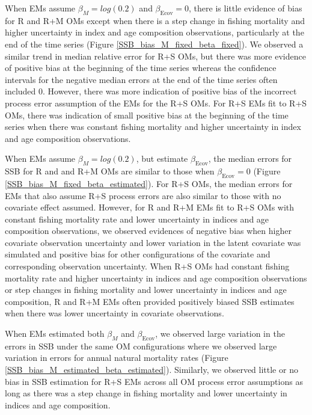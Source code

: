 \documentclass[
  12pt,
]{article}
\begin{document}
When EMs assume \(\beta_M = log(0.2)\) and \(\beta_\text{Ecov} = 0\), there is little evidence of bias for R and R+M OMs except when there is a step change in fishing mortality and higher uncertainty in index and age composition observations, particularly at the end of the time series (Figure \ref{SSB_bias_M_fixed_beta_fixed}). We observed a similar trend in median relative error for R+S OMs, but there was more evidence of positive bias at the beginning of the time series whereas the confidence intervals for the negative median errors at the end of the time series often included 0. However, there was more indication of positive bias of the incorrect process error assumption of the EMs for the R+S OMs. For R+S EMs fit to R+S OMs, there was indication of small positive bias at the beginning of the time series when there was constant fishing mortality and higher uncertainty in index and age composition observations.

When EMs assume \(\beta_M = log(0.2)\), but estimate \(\beta_\text{Ecov}\), the median errors for SSB for R and and R+M OMs are similar to those when \(\beta_\text{Ecov} = 0\) (Figure \ref{SSB_bias_M_fixed_beta_estimated}). For R+S OMs, the median errors for EMs that also assume R+S process errors are also similar to those with no covariate effect assumed. However, for R and R+M EMs fit to R+S OMs with constant fishing mortality rate and lower uncertainty in indices and age composition observations, we observed evidences of negative bias when higher covariate observation uncertainty and lower variation in the latent covariate was simulated and positive bias for other configurations of the covariate and corresponding observation uncertainty. When R+S OMs had constant fishing mortality rate and higher uncertainty in indices and age composition observations or step changes in fishing mortality and lower uncertainty in indices and age composition, R and R+M EMs often provided positively biased SSB estimates when there was lower uncertainty in covariate observations.

When EMs estimated both \(\beta_M\) and \(\beta_\text{Ecov}\), we observed large variation in the errors in SSB under the same OM configurations where we observed large variation in errors for annual natural mortality rates (Figure \ref{SSB_bias_M_estimated_beta_estimated}). Similarly, we observed little or no bias in SSB estimation for R+S EMs across all OM process error assumptions as long as there was a step change in fishing mortality and lower uncertainty in indices and age composition.
\end{document}
